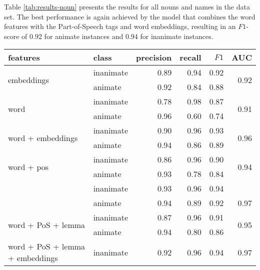 \documentclass[a4paper,UKenglish]{oasics}
\begin{document}
Table \ref{tab:results-noun} presents the results for all nouns and
names in the data set. The best performance is again achieved by the
model that combines the word features with the Part-of-Speech tags and
word embeddings, resulting in an $F1$-score of 0.92 for animate
instances and 0.94 for inanimate instances.


\begin{table}
\centering
\begin{tabular}{llrrrr}
\toprule
features & class &  precision &  recall & $F1$ &  AUC \\
\midrule
\multirow{2}{*}{embeddings}                            & inanimate     &       0.89 &    0.94 &    0.92 & \multirow{2}{*}{0.92} \\
                                                       & animate       &       0.92 &    0.84 &    0.88 &  \\
\multirow{2}{*}{word}                                  & inanimate     &       0.78 &    0.98 &    0.87 & \multirow{2}{*}{0.91} \\
                                                       & animate       &       0.96 &    0.60 &    0.74 &  \\
\multirow{2}{*}{word + embeddings}                     & inanimate     &       0.90 &    0.96 &    0.93 & \multirow{2}{*}{0.96} \\
                                                       & animate       &       0.94 &    0.86 &    0.89 &  \\
\multirow{2}{*}{word + pos}                            & inanimate     &       0.86 &    0.96 &    0.90 & \multirow{2}{*}{0.94} \\
                                                       & animate       &       0.93 &    0.78 &    0.84 &  \\
\rowcolor{Gray}                                        & inanimate     &       0.93 &    0.96 &    0.94 &  \\
\rowcolor{Gray}\multirow{-2}{*}{word + PoS + embeddings} & animate       &       0.94 &    0.89 &    0.92 &\multirow{-2}{*}{0.97}  \\
\multirow{2}{*}{word + PoS + lemma}                    & inanimate     &       0.87 &    0.96 &    0.91 & \multirow{2}{*}{0.95} \\
                                                       & animate       &       0.94 &    0.80 &    0.86 &  \\
\multirow{2}{*}{word + PoS + lemma + embeddings}       & inanimate     &       0.92 &    0.96 &    0.94 & \multirow{2}{*}{0.97} \\

\end{tabular}
\end{table}
\end{document}

